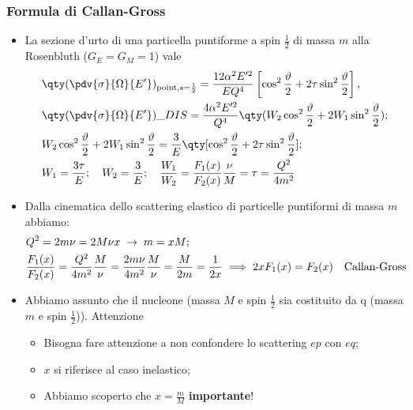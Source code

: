 \subsubsection{Formula di Callan-Gross}
\begin{itemize}
    \item La sezione d'urto di una particella puntiforme a spin $\frac{1}{2}$ di massa $m$ alla Rosenbluth ($G_E=G_M=1$) vale
    \begin{align*}
        &\qty(\pdv{\sigma}{\Omega}{E'})_{\textnormal{point},s=\frac12}= \frac{12\alpha^2 E'^2}{EQ^4} 
        \left[ \cos^2 \frac{\vartheta}{2} + 2 \tau \sin^2 \frac{\vartheta}{2} \right],\\
        &\qty(\pdv{\sigma}{\Omega}{E'})\_{DIS}=\frac{4\alpha^2E'^2}{Q^4}\qty(W_2\cos^2\frac{\vartheta}{2}+2W_1\sin^2\frac{\vartheta}{2});\\
        &W_2\cos^2\frac{\vartheta}{2}+2W_1\sin^2\frac{\vartheta}{2}=\frac{3}{E}\qty[\cos^2\frac{\vartheta}{2}+2\tau\sin^2\frac{\vartheta}{2}];\\
        &W_1=\frac{3\tau}{E};\quad W_2=\frac{3}{E};\quad \frac{W_1}{W_2}=\frac{F_1(x)}{F_2(x)}\frac{\nu}{M}=\tau=\frac{Q^2}{4m^2}
        \end{align*}
        \item Dalla cinematica dello scattering elastico di particelle puntiformi di massa $m$ abbiamo:
        \begin{align*}
            &Q^2 = 2m\nu = 2M\nu x \; \rightarrow \; m = xM;\\
            &\frac{F_1(x)}{F_2(x)}=\frac{Q^2}{4m^2}\frac{M}{\nu}=\frac{2m\nu}{4m^2}\frac{M}{\nu}=\frac{M}{2m}=\frac{1}{2x}\implies 2xF_1(x)=F_2(x)\quad\textnormal{Callan-Gross}
        \end{align*}
        \item Abbiamo assunto che il nucleone (massa $M$ e spin $\frac{1}{2}$ sia costituito da q (massa $m$ e spin $\frac{1}{2}$)). Attenzione
        \begin{itemize}
            \item Bisogna fare attenzione a non confondere lo scattering $ep$ con $eq$;
            \item $x$ si riferisce al caso inelastico;
            \item Abbiamo scoperto che $x=\frac{m}{M}$ \textbf{importante}!
        \end{itemize} 
\end{itemize}

